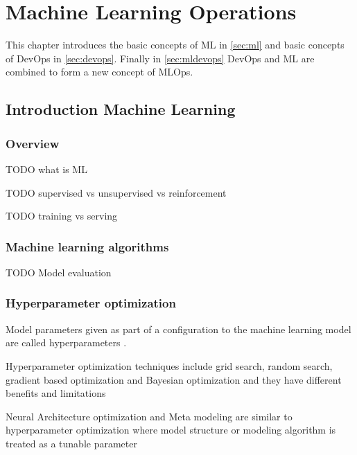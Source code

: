 \chapter{Machine Learning Operations}

This chapter introduces the basic concepts of ML in \autoref{sec:ml} and basic concepts of DevOps in \autoref{sec:devops}. Finally in \autoref{sec:mldevops} DevOps and ML are combined to form a new concept of MLOps.

\section{Introduction Machine Learning}
\label{sec:ml}

\subsection{Overview}
TODO what is ML

TODO supervised vs unsupervised vs reinforcement

TODO training vs serving

\subsection{Machine learning algorithms}

TODO Model evaluation


\subsection{Hyperparameter optimization}

Model parameters given as part of a configuration to the machine learning model are called hyperparameters \parencite{yangHyperparameterOptimizationMachine2020}. 

Hyperparameter optimization techniques include grid search, random search, gradient based optimization and Bayesian optimization and they have different benefits and limitations \parencite{yangHyperparameterOptimizationMachine2020}

Neural Architecture optimization and Meta modeling are similar to hyperparameter optimization where model structure or modeling algorithm is treated as a tunable parameter \parencite{bakerAcceleratingNeuralArchitecture2017} 

